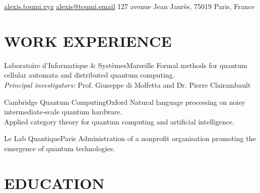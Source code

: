 \documentclass[a4paper,sans]{moderncv}
\begin{document}
\makecvtitle

\vspace{-40pt}

{\centering
    \hypersetup{urlcolor=orange}
    \homepagesymbol \href{https://alexis.toumi.xyz}{alexis.toumi.xyz}
    \hspace{25pt}
    \emailsymbol \href{mailto:alexis@toumi.email}{alexis@toumi.email}
    \hspace{25pt}
    127 avenue Jean Jaurès, 75019 Paris, France
    \par}

\vspace{40pt}

\section{\textbf{WORK EXPERIENCE}}

{Laboratoire d'Informatique \& Syst\`emes}{Marseille}{}{
Formal methods for quantum cellular automata and distributed quantum computing.\\
\emph{Principal investigators:} Prof. Giuseppe di Molfetta and Dr. Pierre Clairambault
}

{Cambridge Quantum Computing}{Oxford}{}{
Natural language processing on noisy intermediate-scale quantum hardware.\\
Applied category theory for quantum computing and artificial intelligence.
}

{Le Lab Quantique}{Paris}{}{
Administration of a nonprofit organisation promoting the emergence of quantum technologies.
}




\section{\textbf{EDUCATION}}
\end{document}

